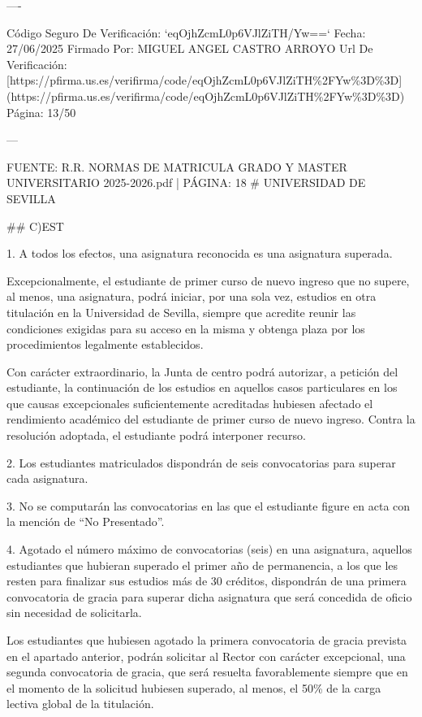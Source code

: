 \documentclass{article}
\begin{document}
\begin{itemize}
\begin{itemize}
\begin{scriptsize}
                  ----

                  Código Seguro De Verificación: `eqOjhZcmL0p6VJlZiTH/Yw==`
                  Fecha: 27/06/2025
                  Firmado Por: MIGUEL ANGEL CASTRO ARROYO
                  Url De Verificación: [https://pfirma.us.es/verifirma/code/eqOjhZcmL0p6VJlZiTH\%2FYw\%3D\%3D](https://pfirma.us.es/verifirma/code/eqOjhZcmL0p6VJlZiTH\%2FYw\%3D\%3D)
                  Página: 13/50

                  ---

                  FUENTE: R.R. NORMAS DE MATRICULA GRADO Y MASTER UNIVERSITARIO 2025-2026.pdf | PÁGINA: 18
                  \# UNIVERSIDAD DE SEVILLA

                  \#\# C)EST

                  1. A todos los efectos, una asignatura reconocida es una asignatura superada.

                  Excepcionalmente, el estudiante de primer curso de nuevo ingreso que no supere, al menos, una asignatura, podrá iniciar, por una sola vez, estudios en otra titulación en la Universidad de Sevilla, siempre que acredite reunir las condiciones exigidas para su acceso en la misma y obtenga plaza por los procedimientos legalmente establecidos.

                  Con carácter extraordinario, la Junta de centro podrá autorizar, a petición del estudiante, la continuación de los estudios en aquellos casos particulares en los que causas excepcionales suficientemente acreditadas hubiesen afectado el rendimiento académico del estudiante de primer curso de nuevo ingreso. Contra la resolución adoptada, el estudiante podrá interponer recurso.

                  2. Los estudiantes matriculados dispondrán de seis convocatorias para superar cada asignatura.

                  3. No se computarán las convocatorias en las que el estudiante figure en acta con la mención de “No Presentado”.

                  4. Agotado el número máximo de convocatorias (seis) en una asignatura, aquellos estudiantes que hubieran superado el primer año de permanencia, a los que les resten para finalizar sus estudios más de 30 créditos, dispondrán de una primera convocatoria de gracia para superar dicha asignatura que será concedida de oficio sin necesidad de solicitarla.

                  Los estudiantes que hubiesen agotado la primera convocatoria de gracia prevista en el apartado anterior, podrán solicitar al Rector con carácter excepcional, una segunda convocatoria de gracia, que será resuelta favorablemente siempre que en el momento de la solicitud hubiesen superado, al menos, el 50\% de la carga lectiva global de la titulación.


\end{scriptsize}
\end{itemize}
\end{itemize}
\end{document}
